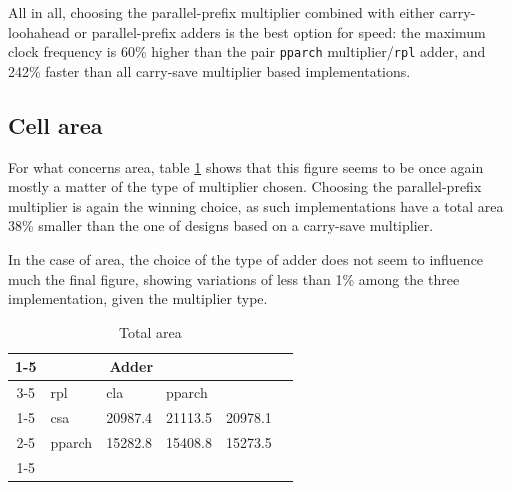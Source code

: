 \documentclass[a4paper]{article}
\begin{document}
All in all, choosing the parallel-prefix multiplier combined with either carry-loohahead or parallel-prefix adders is the best option for speed: the maximum clock frequency is 60\% higher than the pair \texttt{pparch} multiplier/\texttt{rpl} adder, and 242\% faster than all carry-save multiplier based implementations.

\subsection{Cell area}
For what concerns area, table \ref{tab:area} shows that this figure seems to be once again mostly a matter of the type of multiplier chosen. Choosing the parallel-prefix multiplier is again the winning choice, as such implementations have a total area 38\% smaller than the one of designs based on a carry-save multiplier.

In the case of area, the choice of the type of adder does not seem to influence much the final figure, showing variations of less than 1\% among the three implementation, given the multiplier type.
\begin{table}[hbtp]
	\centering
	\begin{tabular}{clllll}
	\cline{1-5}
	\multicolumn{2}{|c|}{}                                                           & \multicolumn{3}{c|}{Adder}                                                                                                                                         &  \\ \cline{3-5}
	\multicolumn{2}{|c|}{\multirow{-2}{*}{Area [\si{\micro\meter^2}]}}                         & \multicolumn{1}{l|}{rpl}                             & \multicolumn{1}{l|}{cla}                             & \multicolumn{1}{l|}{pparch}                          &  \\ \cline{1-5}
	\multicolumn{1}{|c|}{}                             & \multicolumn{1}{l|}{csa}    & \multicolumn{1}{l|}{20987.4} & \multicolumn{1}{l|}{\cellcolor[HTML]{FFCCC9}21113.5} & \multicolumn{1}{l|}{20978.1} &  \\ \cline{2-5}
	\multicolumn{1}{|c|}{\multirow{-2}{*}{Multiplier}} & \multicolumn{1}{l|}{pparch} & \multicolumn{1}{l|}{15282.8} & \multicolumn{1}{l|}{15408.8} & \multicolumn{1}{l|}{\cellcolor[HTML]{9AFF99}15273.5} &  \\ \cline{1-5}
	\multicolumn{1}{l}{}                               &                             &                                                      &                                                      &                                                      &
	\end{tabular}
	\caption{Total area}
	\label{tab:area}
\end{table}
\end{document}
